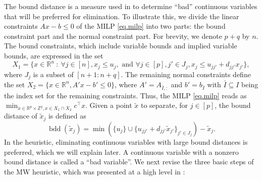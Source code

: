 \documentclass[a4paper,UKenglish,cleveref, autoref,  thm-restate]{lipics-v2021}
\newcommand{\bR}{\mathbb{R}}
\newcommand{\bZ}{\mathbb{Z}}
\newcommand{\relx}[1]{\tilde{#1}}
\DeclareMathOperator{\bd}{bdd}
\begin{document}
	
	The bound distance is a measure used in \cite{marchand2001aggregation,wolter2006implementation} to determine ``bad'' continuous variables that will be preferred for elimination. To illustrate this, we divide the linear constraints $Ax - b \le 0$  of the MILP \eqref{eq.milp} into two parts: the bound constraint part and the normal constraint part. For brevity, we denote $p+q$ by $n$.  The bound constraints, which include variable bounds and implied variable bounds, %
	are expressed in the set
	\begin{equation}
		X_1  =  \{x  \in \bR^n ~:~ \forall j \in [n], x_j \le u_j, \text{ and } \forall j \in [p], j' \in J_j,   x_j \le u_{jj'} + d_{jj'} x_{j'}  \},
	\end{equation}
	where $J_j$ is a subset of $[n+1: n + q]$. The remaining normal constraints define the set $X_2 = \{x  \in \bR^n , A'x - b' \le 0\}$, where $A' = A_{\bar{I},:}$ and $b' = b_{\bar{I}}$ with $\bar{I} \subseteq I$ being the index set for the remaining constraints.  Thus, the MILP \eqref{eq.milp} reads as $\min_{x \in  \bR^p \times \bZ^{q}, x \in X_1 \cap X_2} c^\top x$. Given a point $\relx{x}$ to separate,  for $j \in [p]$, the bound distance of $\relx{x}_j$ is defined as
	\begin{equation}
		\label{eq.bddist}
		\bd(\relx{x}_j) =   \min(\{u_j\} \cup \{u_{jj'} + d_{jj'}\relx{x}_{j'} \}_{j' \in J_j}) - \relx{x}_j.
	\end{equation} In the heuristic, eliminating continuous variables with large bound distances is preferred, which we will explain later. A continuous variable with a nonzero bound distance is called a ``bad variable''.
	We next revise the three basic steps of the MW heuristic, which was presented at a high level in \cite{marchand2001aggregation}:
\end{document}
